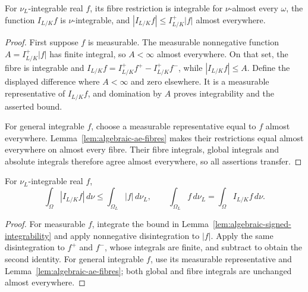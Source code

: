 \begin{lemma}\label{lem:algebraic-signed-integrability}
\leanok
{}
For $\nu_L$-integrable real $f$, its fibre restriction is integrable
for $\nu$-almost every $\omega$, the function $I_{L/K}f$ is
$\nu$-integrable, and $|I_{L/K}f|\le I^+_{L/K}|f|$ almost everywhere.
\end{lemma}
\begin{proof}
First suppose $f$ is measurable. The measurable nonnegative function
$A=I^+_{L/K}|f|$ has finite integral, so $A<\infty$ almost everywhere.
On that set, the fibre is integrable and
$I_{L/K}f=I^+_{L/K}f^+-I^+_{L/K}f^-$, while
$|I_{L/K}f|\le A$. Define the displayed difference where $A<\infty$
and zero elsewhere. It is a measurable representative of $I_{L/K}f$,
and domination by $A$ proves integrability and the asserted bound.

For general integrable $f$, choose a measurable representative equal
to $f$ almost everywhere. Lemma~\ref{lem:algebraic-ae-fibres} makes
their restrictions equal almost everywhere on almost every fibre.
Their fibre integrals, global integrals and absolute integrals therefore
agree almost everywhere, so all assertions transfer.
\end{proof}

\begin{proposition}\label{prop:algebraic-signed-disintegration}
\leanok
{}
For $\nu_L$-integrable real $f$,
\[
 \int_\Omega|I_{L/K}f|\,d\nu\le\int_{\Omega_L}|f|\,d\nu_L,
 \qquad
 \int_{\Omega_L}f\,d\nu_L=\int_\Omega I_{L/K}f\,d\nu.
\]
\end{proposition}
\begin{proof}
For measurable $f$, integrate the bound in
Lemma~\ref{lem:algebraic-signed-integrability} and apply nonnegative
disintegration to $|f|$. Apply the same disintegration to $f^+$ and
$f^-$, whose integrals are finite, and subtract to obtain the second
identity. For general integrable $f$, use its measurable representative
and Lemma~\ref{lem:algebraic-ae-fibres}; both global and fibre
integrals are unchanged almost everywhere.
\end{proof}

